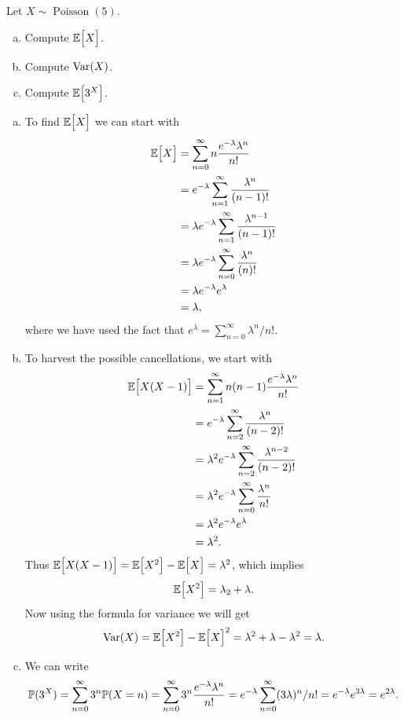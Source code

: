 \begin{problem}
	Let $ X\sim \operatorname{Poisson}(5) $.
	\begin{enumerate}[(a)]
		\item Compute $ \mathbb{E}\big[X\big] $.
		\item Compute $ \operatorname{Var}(X) $.
		\item Compute $ \mathbb{E}\big[3^X\big] $. 
	\end{enumerate}
\end{problem}
\begin{solution}
	\begin{enumerate}[(a)]
		\item To find $ \mathbb{E}\big[X\big] $ we can start with
		\begin{align*}
			\mathbb{E}\big[X\big] &= \sum_{n=0}^{\infty} n \frac{e^{-\lambda} \lambda^n}{n!} \\
			&=e^{-\lambda} \sum_{n=1}^{\infty} \frac{\lambda^n}{(n-1)!} \\
			&=\lambda e^{-\lambda} \sum_{n=1}^{\infty} \frac{\lambda^{n-1}}{(n-1)!}\\
			&=\lambda e^{-\lambda} \sum_{n=0}^{\infty} \frac{\lambda^{n}}{(n)!}\\
			&=\lambda e^{-\lambda} e^\lambda \\
			&=\lambda,
		\end{align*}
		where we have used the fact that $ e^\lambda = \sum_{n=0}^{\infty}\lambda^n/n!. $
		
		\item To harvest the possible cancellations, we start with
		\begin{align*}
			\mathbb{E}\big[X(X-1)\big] &= \sum_{n=1}^{\infty} n(n-1) \frac{e^{-\lambda} \lambda^n}{n!} \\
			&= e^{-\lambda} \sum_{n=2}^{\infty} \frac{\lambda^n}{(n-2)!} \\
			&= \lambda^2 e^{-\lambda} \sum_{n=2}^{\infty} \frac{\lambda^{n-2}}{(n-2)!} \\
			&= \lambda^2 e^{-\lambda} \sum_{n=0}^{\infty} \frac{\lambda^{n}}{n!}\\
			&= \lambda^2 e^{-\lambda} e^\lambda \\
			&= \lambda^2.
		\end{align*}
		Thus $ \mathbb{E}\big[X(X-1)\big] = \mathbb{E}\big[X^2\big]-\mathbb{E}\big[X\big] = \lambda^2 $, which implies
		\[ \mathbb{E}\big[X^2\big] = \lambda_2 + \lambda. \]
		Now using the formula for variance we will get
		\[ \operatorname{Var}(X) = \mathbb{E}\big[X^2\big] - \mathbb{E}\big[X\big]^2 = \lambda^2 + \lambda - \lambda^2 = \lambda. \]
		
		
		\item We can write
		\[ \mathbb{P}(3^X) = \sum_{n=0}^{\infty} 3^n \mathbb{P}(X=n) = \sum_{n=0}^{\infty} 3^n \frac{e^{-\lambda}\lambda^n}{n!} = e^{-\lambda} \sum_{n=0}^{\infty} (3\lambda)^n/n! = e^{-\lambda}e^{3\lambda} = e^{2\lambda}. \]
	\end{enumerate}
\end{solution}

